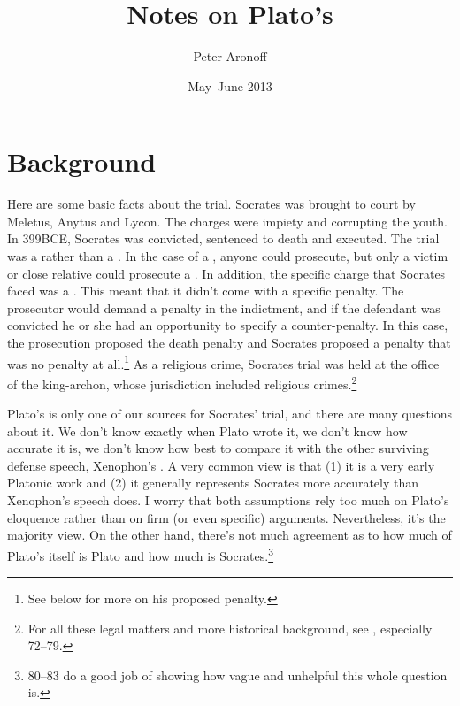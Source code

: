 \documentclass[11pt]{article}
\begin{document}
\begin{titlepage}
\title{Notes on Plato's }
\author{Peter Aronoff}
\date{May--June 2013}
\maketitle
\end{titlepage}

\section{Background}

Here are some basic facts about the trial.  Socrates was brought to court by Meletus, Anytus and Lycon.  The charges were impiety and corrupting the youth.  In 399BCE, Socrates was convicted, sentenced to death and executed.  The trial was a  rather than a .  In the case of a , anyone could prosecute, but only a victim or close relative could prosecute a .  In addition, the specific charge that Socrates faced was a .  This meant that it didn't come with a specific penalty.  The prosecutor would demand a penalty in the indictment, and if the defendant was convicted he or she had an opportunity to specify a counter-penalty.  In this case, the prosecution proposed the death penalty and Socrates proposed a penalty that was no penalty at all.\footnote{See below for more on his proposed penalty.}  As a religious crime, Socrates trial was held at the office of the king-archon, whose jurisdiction included religious crimes.\footnote{For all these legal matters and more historical background, see \citet{brickhouse2004}, especially 72--79.}

Plato's  is only one of our sources for Socrates' trial, and there are many questions about it.  We don't know exactly when Plato wrote it, we don't know how accurate it is, we don't know how best to compare it with the other surviving defense speech, Xenophon's .  A very common view is that (1) it is a very early Platonic work and (2) it generally represents Socrates more accurately than Xenophon's speech does.  I worry that both assumptions rely too much on Plato's eloquence rather than on firm (or even specific) arguments.  Nevertheless, it's the majority view.  On the other hand, there's not much agreement as to how much of Plato's  itself is Plato and how much is Socrates.\footnote{ \citet{brickhouse2004} 80--83 do a good job of showing how vague and unhelpful this whole question is.}
\end{document}
